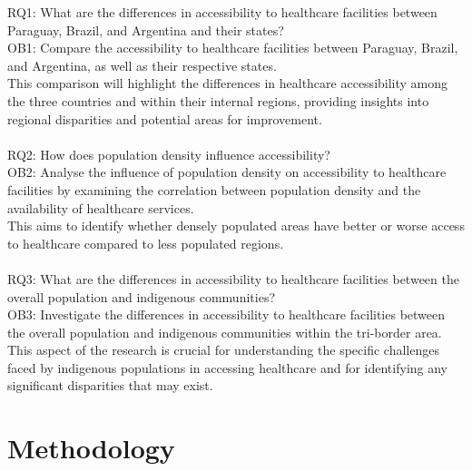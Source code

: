 \documentclass[11pt, a4paper]{report}
\begin{document}
RQ1: What are the differences in accessibility to healthcare facilities between Paraguay, Brazil, and Argentina and their states? \\
%
OB1: Compare the accessibility to healthcare facilities between Paraguay, Brazil, and Argentina, as well as their respective states. \\
%
This comparison will highlight the differences in healthcare accessibility among the three countries and within their internal regions, providing insights into regional disparities and potential areas for improvement. \\\\
%
RQ2: How does population density influence accessibility? \\
%
OB2: Analyse the influence of population density on accessibility to healthcare facilities by examining the correlation between population density and the availability of healthcare services. \\
%
This aims to identify whether densely populated areas have better or worse access to healthcare compared to less populated regions.\\\\
%
RQ3: What are the differences in accessibility to healthcare facilities between the overall population and indigenous communities? \\
%
OB3: Investigate the differences in accessibility to healthcare facilities between the overall population and indigenous communities within the tri-border area. \\
%
This aspect of the research is crucial for understanding the specific challenges faced by indigenous populations in accessing healthcare and for identifying any significant disparities that may exist.

\chapter{Methodology}\label{sec:methodology}
\end{document}
